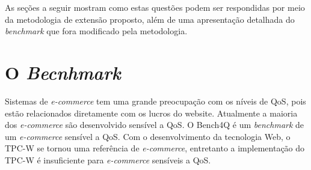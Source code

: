 



As seções a seguir mostram como estas questões podem ser respondidas por meio da metodologia de extensão proposto, além de uma apresentação detalhada do \textit{benchmark} que fora modificado pela metodologia.



\section{O \textit{Becnhmark}}

Sistemas de \textit{e-commerce} tem uma grande preocupação com os níveis de QoS, pois estão relacionados diretamente com os lucros do website. Atualmente a maioria dos \textit{e-commerce} são desenvolvido sensível a QoS. O Bench4Q é um \textit{benchmark} de um \textit{e-commerce} sensível a QoS.  Com o desenvolvimento da tecnologia Web, o TPC-W se tornou uma referência de \textit{e-commerce}, entretanto a implementação do TPC-W é insuficiente para \textit{e-commerce} sensíveis a QoS.

